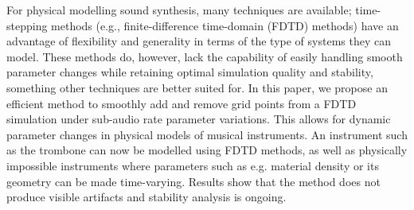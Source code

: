 For physical modelling sound synthesis, many techniques are available; time-stepping methods (e.g., finite-difference time-domain (FDTD) methods) have an advantage of flexibility and generality in terms of the type of systems they can model. These methods do, however, lack the capability of easily handling smooth parameter changes 
while retaining optimal simulation quality and stability, something other techniques are better suited for. In this paper, we propose an efficient method to smoothly add and remove grid points from a FDTD simulation under sub-audio rate parameter variations. This allows for dynamic parameter changes in physical models of musical instruments. An instrument such as the trombone can now be modelled using FDTD methods, as well as physically impossible instruments where parameters such as e.g. material density or its geometry can be made time-varying. Results show that the method does not produce visible artifacts and stability analysis is ongoing.

